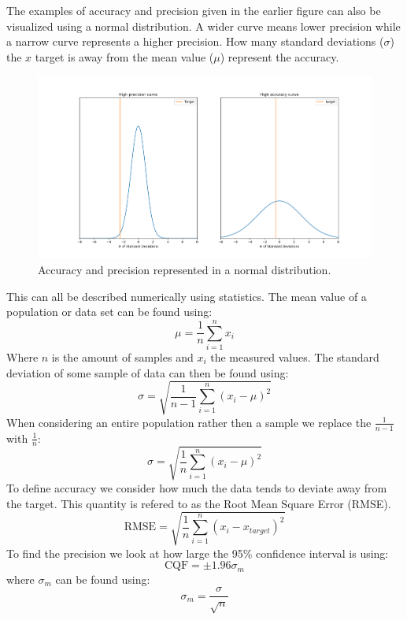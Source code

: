 \documentclass[11pt, a4paper]{article}
\numberwithin{equation}{section}
\numberwithin{figure}{section}
\begin{document}
The examples of accuracy and precision given in the earlier figure can also be visualized using a normal distribution. A wider curve means lower precision while a narrow curve represents a higher precision. How many standard deviations ($\sigma$) the $x$ target is away from the mean value ($\mu$) represent the accuracy.
\begin{figure}[h]
  \centerline{\includegraphics[width=140mm]{images/Gaussian_curves.png}}
  \caption{Accuracy and precision represented in a normal distribution.}
\end{figure}
This can all be described numerically using statistics. The mean value of a population or data set can be found using:
\begin{equation}
  \mu = \frac{1}{n}\sum_{i=1}^{n}x_i
\end{equation}
Where $n$ is the amount of samples and $x_i$ the measured values. The standard deviation of some sample of data can then be found using:
\begin{equation}
  \sigma = \sqrt{\frac{1}{n-1}\sum_{i=1}^{n}(x_i - \mu)^2}
\end{equation}
When considering an entire population rather then a sample we replace the $\frac{1}{n-1}$ with $\frac{1}{n}$:
\begin{equation}
  \sigma = \sqrt{\frac{1}{n}\sum_{i=1}^{n}(x_i - \mu)^2}
\end{equation}
To define accuracy we consider how much the data tends to deviate away from the target. This quantity is refered to as the Root Mean Square Error (RMSE).
\begin{equation}
  \text{RMSE} = \sqrt{\frac{1}{n}\sum_{i=1}^{n}(x_i - x_{target})^2}
\end{equation}
To find the precision we look at how large the 95\% confidence interval is using:
\begin{equation}
  \text{CQF} = \pm 1.96\sigma_m
\end{equation}
where $\sigma_m$ can be found using:
\begin{equation}
  \sigma_m = \frac{\sigma}{\sqrt{n}}
\end{equation}
\end{document}
